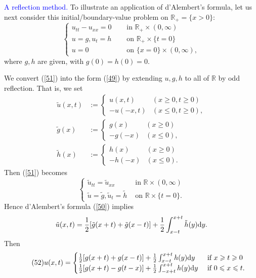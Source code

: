 \documentclass[hyperref,UTF8,12pt]{article}
\numberwithin{equation}{subsection}
\theoremstyle{plain}
\theoremstyle{definition}
\numberwithin{theorem}{section}
\numberwithin{lemma}{section}
\numberwithin{proposition}{section}
\numberwithin{remark}{section}
\numberwithin{corollary}{section}
\numberwithin{definition}{section}
\numberwithin{problem}{section}
\numberwithin{example}{section}
\def\dif{\textup{d}}
\newcommand{\mr}{\mathbb{R}}
\renewcommand{\leq}{\leqslant}
\renewcommand{\geq}{\geqslant}
\begin{document}
\noindent\textcolor{blue}{A reflection method.} To illustrate an application of d'Alembert's formula, let us next consider this initial/boundary-value problem on $\mr_+=\{x>0\}$: \[\tag{51}\label{51}\left\{\begin{aligned}
	u_{tt}-u_{xx}=0&\quad\text{ in } \mr_+\times(0,\infty)\\
	u=g,u_t=h&\quad\text{ on } \mr_+\times\{t=0\}\\
	u=0&\quad\text{ on }\{x=0\}\times(0,\infty),
\end{aligned}\right.\]where $g,h$ are given, with $g(0)=h(0)=0$.

We convert (\ref{51}) into the form (\ref{49}) by extending $u,g,h$ to all of $\mr$ by odd reflection. That is, we set\[\begin{aligned}
	\tilde{u}(x,t)&:=\begin{cases}u(x,t)&(x\geq0,t\geq0) \\
		-u(-x,t)&(x\leq0,t\geq0),\end{cases}\\
	\tilde{g}(x)&:=\begin{cases}g(x)&(x\geq0)\\
		-g(-x)&(x\leq0),\end{cases}\\
	\tilde{h}(x)&:=\begin{cases}h(x)&(x\geq0)\\
		-h(-x)&(x\leq0).\end{cases}
\end{aligned}\]Then (\ref{51}) becomes \[\begin{cases}\tilde{u}_{tt}=\tilde{u}_{xx}& \text{ in } \mr\times(0,\infty)\\ \tilde{u}=\tilde{g},\tilde{u}_t=\tilde{h}& \text{ on } \mr\times\{t=0\}.\end{cases}\]Hence d'Alembert's formula (\ref{50}) implies
\[\tilde{u}(x,t)=\frac{1}{2}[\tilde{g}(x+t)+\tilde{g}(x-t)]+\frac{1}{2}\int_{x-t}^{x+t} \tilde{h}(y)\dif y.\]Then \[\tag{52}\label{52}
u(x,t)=\begin{cases}\frac{1}{2}[g(x+t)+g(x-t)]+\frac{1}{2}\int_{x-t}^{x+t}h(y)\dif y & \text{ if } x\geq t\geq0\\ \frac{1}{2}[g(x+t)-g(t-x)]+\frac{1}{2}\int_{-x+t}^{x+t} h(y)\dif y&\text{ if } 0\leq x\leq t.\end{cases}\]
\end{document}
